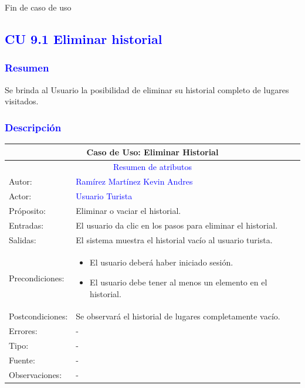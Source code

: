 \newpage
Fin de caso de uso



\pagebreak
\subsection{\textcolor{blue}{CU 9.1 Eliminar historial}}

\subsubsection{\textcolor{blue}{Resumen}}
Se brinda al Usuario la posibilidad de eliminar su historial completo de lugares visitados.
\subsubsection{\textcolor{blue}{Descripción}}
\begin{tabularx}{16cm}{||l|X||}
	\hline
	\multicolumn{2}{||c||}{Caso de Uso: Eliminar Historial} \\
	\hline
	\multicolumn{2}{||c||}{\textcolor{blue}{Resumen de atributos}} \\
 \hline
	{Autor:} & {\textcolor{blue}{Ramírez Martínez Kevin Andres}} \\
	\hline
	\hline
	{Actor:} & {\textcolor{blue}{Usuario Turista}} \\
	\hline
	{Próposito:} & Eliminar o vaciar el historial.\\
	\hline
	{Entradas:} & El usuario da clic en los pasos para eliminar el historial.
        \\
	\hline
	{Salidas:} & El sistema muestra el historial vacío al usuario turista.\\
	\hline
	{Precondiciones:} & 
        \begin{itemize}
            \item El usuario deberá haber iniciado sesión.
            \item El usuario debe tener al menos un elemento en el historial.
        \end{itemize}\\ 
	\hline
	{Postcondiciones:} & Se observará el historial de lugares completamente vacío.\\
	\hline
	{Errores:} & {-} \\
	\hline
	{Tipo:} & {-}\\
	\hline
	{Fuente:} & {-} \\
	\hline
	{Observaciones:} & {-} \\
	\hline
\end{tabularx}

